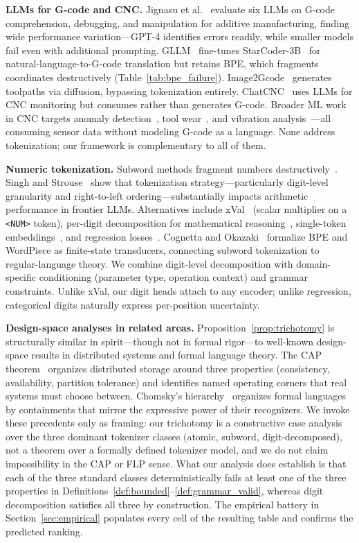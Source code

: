 \documentclass[11pt]{article}
\begin{document}
\textbf{LLMs for G-code and CNC.}
Jignasu et al.~\cite{gcode_foundational} evaluate six LLMs on G-code comprehension, debugging, and manipulation for additive manufacturing, finding wide performance variation---GPT-4 identifies errors readily, while smaller models fail even with additional prompting.
GLLM~\cite{gllm} fine-tunes StarCoder-3B~\cite{starcoder} for natural-language-to-G-code translation but retains BPE, which fragments coordinates destructively (Table~\ref{tab:bpe_failure}). Image2Gcode~\cite{image2gcode} generates toolpaths via diffusion, bypassing tokenization entirely. ChatCNC~\cite{chatcnc} uses LLMs for CNC monitoring but consumes rather than generates G-code. Broader ML work in CNC targets anomaly detection~\cite{cnc_anomaly}, tool wear~\cite{tool_wear}, and vibration analysis~\cite{vibration}---all consuming sensor data without modeling G-code as a language. None address tokenization; our framework is complementary to all of them.

\textbf{Numeric tokenization.}
Subword methods fragment numbers destructively~\cite{nogueira_numbers}. Singh and Strouse~\cite{tokenization_counts} show that tokenization strategy---particularly digit-level granularity and right-to-left ordering---substantially impacts arithmetic performance in frontier LLMs. Alternatives include xVal~\cite{xval} (scalar multiplier on a \texttt{<NUM>} token), per-digit decomposition for mathematical reasoning~\cite{digit_token}, single-token embeddings~\cite{single_token_numbers}, and regression losses~\cite{regress_dont_guess}. Cognetta and Okazaki~\cite{tokenization_fst} formalize BPE and WordPiece as finite-state transducers, connecting subword tokenization to regular-language theory. We combine digit-level decomposition with domain-specific conditioning (parameter type, operation context) and grammar constraints. Unlike xVal, our digit heads attach to any encoder; unlike regression, categorical digits naturally express per-position uncertainty.

\textbf{Design-space analyses in related areas.}
Proposition~\ref{prop:trichotomy} is structurally similar in spirit---though not in formal rigor---to well-known design-space results in distributed systems and formal language theory. The CAP theorem~\cite{cap_brewer,cap_gilbert_lynch} organizes distributed storage around three properties (consistency, availability, partition tolerance) and identifies named operating corners that real systems must choose between. Chomsky's hierarchy~\cite{chomsky_hierarchy} organizes formal languages by containments that mirror the expressive power of their recognizers. We invoke these precedents only as framing: our trichotomy is a constructive case analysis over the three dominant tokenizer classes (atomic, subword, digit-decomposed), not a theorem over a formally defined tokenizer model, and we do not claim impossibility in the CAP or FLP sense. What our analysis does establish is that each of the three standard classes deterministically fails at least one of the three properties in Definitions~\ref{def:bounded}--\ref{def:grammar_valid}, whereas digit decomposition satisfies all three by construction. The empirical battery in Section~\ref{sec:empirical} populates every cell of the resulting table and confirms the predicted ranking.
\end{document}
